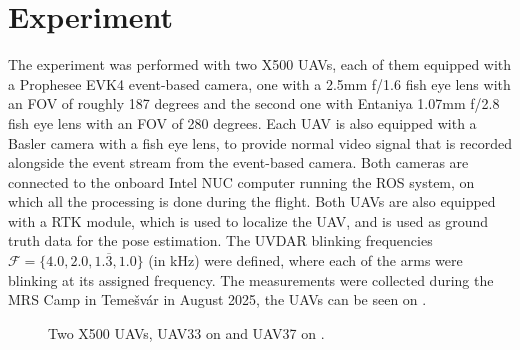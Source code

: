 
\chapter{Experiment\label{chap:experiment}}

The experiment was performed with two X500 \ac{UAV}s, each of them equipped with a Prophesee EVK4 event-based camera, one with a 2.5mm f/1.6
fish eye lens with an \ac{FOV} of roughly 187 degrees and the second one with Entaniya 1.07mm f/2.8 fish eye lens with an \ac{FOV} of 280 degrees.
Each UAV is also equipped with a Basler camera with a fish eye lens, to provide normal video signal that is recorded alongside the event stream
from the event-based camera.
Both cameras are connected to the onboard Intel NUC computer running the ROS system, on which all the processing is done during the flight. Both 
\ac{UAV}s are also equipped with a \ac{RTK} module, which is used to localize the \ac{UAV}, and is used as ground truth data for the pose estimation.
The UVDAR blinking frequencies $\mathcal{F} = \{4.0, 2.0, 1.\overline{3}, 1.0\}$ (in kHz) were defined, where each of the arms were blinking at its assigned
frequency.
The measurements were collected during the \ac{MRS} Camp in Temešvár in August 2025, the \ac{UAV}s can be seen on .
\begin{figure}[H]
	\centering
	\caption{
		Two X500 UAVs, UAV33 on  and UAV37 on .
  }
	\label{fig:uav33_37}
\end{figure}
